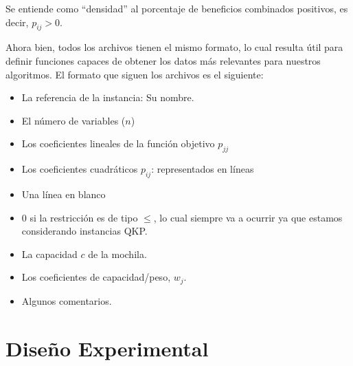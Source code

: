 Se entiende como ``densidad'' al porcentaje de beneficios combinados positivos, es decir, $p_{ij} > 0$. 

Ahora bien, todos los archivos tienen el mismo formato, lo cual resulta útil para definir funciones capaces de obtener los datos más relevantes para nuestros algoritmos. 
El formato que siguen los archivos es el siguiente:
\begin{itemize}
	\item La referencia de la instancia: Su nombre.
	\item El número de variables ($n$)
	\item Los coeficientes lineales de la función objetivo $p_{jj}$
	\item Los coeficientes cuadráticos $p_{ij}$: representados en líneas
	\item Una línea en blanco
	\item 0 si la restricción es de tipo $\leq$, lo cual siempre va a ocurrir ya que estamos considerando instancias QKP.
	\item La capacidad $c$ de la mochila.
	\item Los coeficientes de capacidad/peso, $w_j$.
	\item Algunos comentarios.
\end{itemize}


\section{Diseño Experimental}